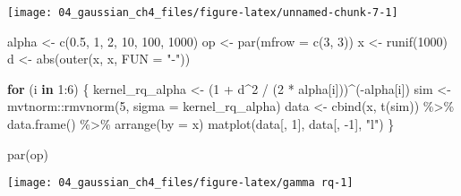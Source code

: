 \documentclass[
]{article}
\newenvironment{Shaded}{\begin{snugshade}}{\end{snugshade}}
\newcommand{\AttributeTok}[1]{\textcolor[rgb]{0.77,0.63,0.00}{#1}}
\newcommand{\ControlFlowTok}[1]{\textcolor[rgb]{0.13,0.29,0.53}{\textbf{#1}}}
\newcommand{\DecValTok}[1]{\textcolor[rgb]{0.00,0.00,0.81}{#1}}
\newcommand{\FloatTok}[1]{\textcolor[rgb]{0.00,0.00,0.81}{#1}}
\newcommand{\FunctionTok}[1]{\textcolor[rgb]{0.00,0.00,0.00}{#1}}
\newcommand{\NormalTok}[1]{#1}
\newcommand{\OtherTok}[1]{\textcolor[rgb]{0.56,0.35,0.01}{#1}}
\newcommand{\SpecialCharTok}[1]{\textcolor[rgb]{0.00,0.00,0.00}{#1}}
\newcommand{\StringTok}[1]{\textcolor[rgb]{0.31,0.60,0.02}{#1}}
\begin{document}
\begin{center}\texttt{[image: 04\_gaussian\_ch4\_files/figure-latex/unnamed-chunk-7-1]} \end{center}

\begin{Shaded}
\begin{Highlighting}[]
\NormalTok{alpha }\OtherTok{\textless{}{-}} \FunctionTok{c}\NormalTok{(}\FloatTok{0.5}\NormalTok{, }\DecValTok{1}\NormalTok{, }\DecValTok{2}\NormalTok{, }
          \DecValTok{10}\NormalTok{, }\DecValTok{100}\NormalTok{, }\DecValTok{1000}\NormalTok{)}
\NormalTok{op }\OtherTok{\textless{}{-}} \FunctionTok{par}\NormalTok{(}\AttributeTok{mfrow =} \FunctionTok{c}\NormalTok{(}\DecValTok{3}\NormalTok{, }\DecValTok{3}\NormalTok{))}
\NormalTok{x }\OtherTok{\textless{}{-}} \FunctionTok{runif}\NormalTok{(}\DecValTok{1000}\NormalTok{)}
\NormalTok{d }\OtherTok{\textless{}{-}} \FunctionTok{abs}\NormalTok{(}\FunctionTok{outer}\NormalTok{(x, x, }\AttributeTok{FUN =} \StringTok{"{-}"}\NormalTok{))}

\ControlFlowTok{for}\NormalTok{ (i }\ControlFlowTok{in} \DecValTok{1}\SpecialCharTok{:}\DecValTok{6}\NormalTok{) \{}
\NormalTok{  kernel\_rq\_alpha }\OtherTok{\textless{}{-}}\NormalTok{ (}\DecValTok{1} \SpecialCharTok{+}\NormalTok{ d}\SpecialCharTok{\^{}}\DecValTok{2} \SpecialCharTok{/}\NormalTok{ (}\DecValTok{2} \SpecialCharTok{*}\NormalTok{ alpha[i]))}\SpecialCharTok{\^{}}\NormalTok{(}\SpecialCharTok{{-}}\NormalTok{alpha[i])}
\NormalTok{  sim }\OtherTok{\textless{}{-}}\NormalTok{ mvtnorm}\SpecialCharTok{::}\FunctionTok{rmvnorm}\NormalTok{(}\DecValTok{5}\NormalTok{, }\AttributeTok{sigma =}\NormalTok{ kernel\_rq\_alpha)}
\NormalTok{  data }\OtherTok{\textless{}{-}} \FunctionTok{cbind}\NormalTok{(x, }\FunctionTok{t}\NormalTok{(sim)) }\SpecialCharTok{\%\textgreater{}\%} 
    \FunctionTok{data.frame}\NormalTok{() }\SpecialCharTok{\%\textgreater{}\%}
    \FunctionTok{arrange}\NormalTok{(}\AttributeTok{by =}\NormalTok{ x)}
  \FunctionTok{matplot}\NormalTok{(data[, }\DecValTok{1}\NormalTok{], data[, }\SpecialCharTok{{-}}\DecValTok{1}\NormalTok{], }\StringTok{"l"}\NormalTok{)}
\NormalTok{\}}

\FunctionTok{par}\NormalTok{(op)}
\end{Highlighting}
\end{Shaded}

\begin{center}\texttt{[image: 04\_gaussian\_ch4\_files/figure-latex/gamma rq-1]} \end{center}
\end{document}
